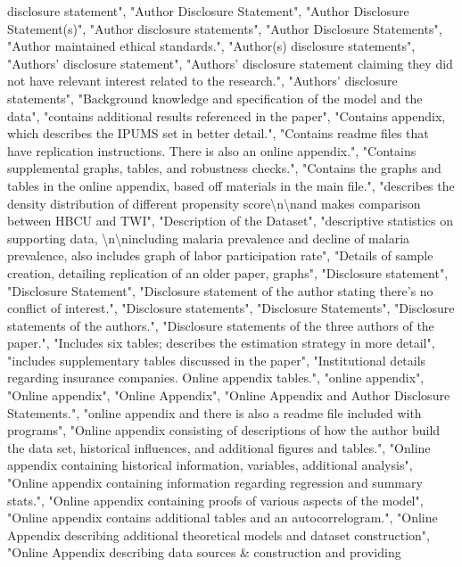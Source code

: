 \documentclass[]{article}
\begin{document}
\begin{itemize}
  disclosure statement", "Author Disclosure Statement", "Author
  Disclosure Statement(s)", "Author disclosure statements", "Author
  Disclosure Statements", "Author maintained ethical standards.",
  "Author(s) disclosure statements", "Authors' disclosure statement",
  "Authors' disclosure statement claiming they did not have relevant
  interest related to the research.", "Authors' disclosure statements",
  "Background knowledge and specification of the model and the data",
  "contains additional results referenced in the paper", "Contains
  appendix, which describes the IPUMS set in better detail.", "Contains
  readme files that have replication instructions. There is also an
  online appendix.", "Contains supplemental graphs, tables, and
  robustness checks.", "Contains the graphs and tables in the online
  appendix, based off materials in the main file.", "describes the
  density distribution of different propensity
  score\textbackslash{}n\textbackslash{}nand makes comparison between
  HBCU and TWI", "Description of the Dataset", "descriptive statistics
  on supporting data, \textbackslash{}n\textbackslash{}nincluding
  malaria prevalence and decline of malaria prevalence, also includes
  graph of labor participation rate", "Details of sample creation,
  detailing replication of an older paper, graphs", "Disclosure
  statement", "Disclosure Statement", "Disclosure statement of the
  author stating there's no conflict of interest.", "Disclosure
  statements", "Disclosure Statements", "Disclosure statements of the
  authors.", "Disclosure statements of the three authors of the paper.",
  "Includes six tables; describes the estimation strategy in more
  detail", "includes supplementary tables discussed in the paper",
  "Institutional details regarding insurance companies. Online appendix
  tables.", "online appendix", "Online appendix", "Online Appendix",
  "Online Appendix and Author Disclosure Statements.", "online appendix
  and there is also a readme file included with programs", "Online
  appendix consisting of descriptions of how the author build the data
  set, historical influences, and additional figures and tables.",
  "Online appendix containing historical information, variables,
  additional analysis", "Online appendix containing information
  regarding regression and summary stats.", "Online appendix containing
  proofs of various aspects of the model", "Online appendix contains
  additional tables and an autocorrelogram.", "Online Appendix
  describing additional theoretical models and dataset construction",
  "Online Appendix describing data sources \& construction and providing

\end{itemize}
\end{document}
